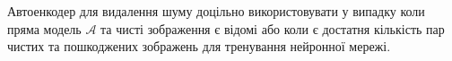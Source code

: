 \documentclass[14pt,a4paper]{extarticle}
\newcounter{e}
\newtheorem{defn}[theorem]{Означення}
\numberwithin{equation}{section}
\numberwithin{figure}{section}
\begin{document}
	Автоенкодер для видалення шуму доцільно використовувати у випадку коли пряма модель $\mathcal{A}$ та чисті зображення є відомі або коли є достатня кількість пар чистих та пошкоджених зображень для тренування нейронної мережі. 

\end{document}
